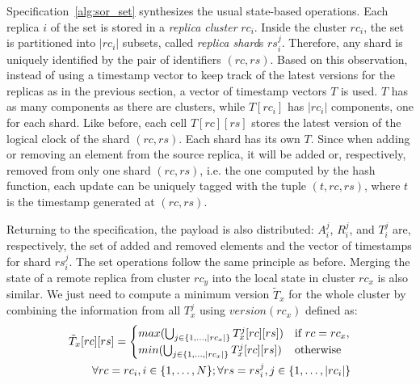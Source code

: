 \begin{algorithm}[t]
{
 }
\end{algorithm}

Specification~\ref{alg:sor_set} synthesizes the usual state-based operations.
Each replica $i$ of the set is stored in a \textit{replica cluster} $rc_{i}$.
Inside the cluster $rc_{i}$, the set is partitioned into $|rc_{i}|$ subsets,
called \textit{replica shard}s $rs_{i}^{j}$. Therefore, any shard is uniquely
identified by the pair of identifiers $(rc, rs)$. Based on this observation,
instead of using a timestamp vector to keep track of the latest versions for the
replicas as in the previous section, a vector of timestamp vectors $T$ is
used. $T$ has as many components as there are clusters, while $T[rc_{i}]$ has
$|rc_{i}|$ components, one for each shard. Like before, each cell $T[rc][rs]$
stores the latest version of the logical clock of the shard $(rc, rs)$. Each
shard has its own $T$. Since when adding or removing an element from the source
replica, it will be added or, respectively, removed from only one shard $(rc,
rs)$, i.e. the one computed by the hash function, each update can be uniquely
tagged with the tuple $(t, rc, rs)$, where $t$ is the timestamp generated at
$(rc, rs)$.

Returning to the specification, the payload is also distributed: $A_{i}^{j}$,
$R_{i}^{j}$, and $T_{i}^{j}$ are, respectively, the set of added and removed
elements and the vector of timestamps for shard $rs_{i}^{j}$. The set operations
follow the same principle as before. Merging the state of a remote replica from
cluster $rc_{y}$ into the local state in cluster $rc_{x}$ is also similar. We
just need to compute a minimum version $\tilde{T}_{x}$ for the whole cluster by
combining the information from all $T_{x}^{j}$ using $version(rc_{x})$ defined
as:
\small
\begin{align*}
\tilde{T}_{x}[rc][rs] = \begin{cases}
                            max (\bigcup_{j \in \{1,\ldots,|rc_{x}|\}} T_{x}^{j}[rc][rs]) & \text{if } rc = rc_{x}, \\
                            min (\bigcup_{j \in \{1,\ldots,|rc_{x}|\}} T_{x}^{j}[rc][rs]) & \text{otherwise }
                        \end{cases}
\\
\hfill \forall rc = rc_{i}, i \in \{1,\ldots,N\}; \forall rs = rs_{i}^{j}, j \in \{1,\ldots,|rc_{i}|\}
\end{align*}
\normalsize

